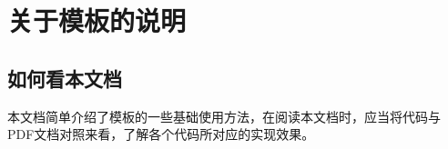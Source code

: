 %
% 
%

    
\chapter{关于模板的说明}\label{ch:1}


\section{如何看本文档}
本文档简单介绍了模板的一些基础使用方法，在阅读本文档时，应当将代码与PDF文档对照来看，了解各个代码所对应的实现效果。


